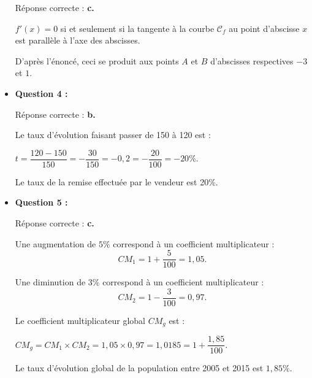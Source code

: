 \begin{corrige}
\begin{itemize}
          Réponse correcte :\quad\textbf{ c.}
          \par
          $f'(x)=0$ si et seulement si la tangente à la courbe $\mathscr{C}_f$ au point d'abscisse $x$ est parallèle à l'axe des abscisses.
          \par
          D'après l'énoncé, ceci se produit aux points $A$ et $B$ d'abscisses respectives $-3$ et $1$.
          \par
          \par
          \item \textbf{Question 4 :}
          \par
          Réponse correcte :\quad\textbf{ b.}
          \par
          Le taux d'évolution faisant passer de 150 à 120 est :
          \par
          $t=\dfrac{120-150}{150}=-\dfrac{30}{150}=-0,2=-\dfrac{20}{100}=-20\%$.
          \par
          Le taux de la remise effectuée par le vendeur est 20\%.
          \par
          \par
          \item \textbf{Question 5 :}
          \par
          Réponse correcte :\quad\textbf{ c.}
          \par
          Une augmentation de $5\%$ correspond à un coefficient multiplicateur :
          \[ CM_1=1+\dfrac{5}{100} = 1,05.\]
          \par
          Une diminution de $3\%$ correspond à un coefficient multiplicateur :
          \[ CM_2=1-\dfrac{3}{100} =0,97. \]
          \par
          Le coefficient multiplicateur global $CM_g$ est :
          \par
          $ CM_g=CM_1\times CM_2 = 1,05\times 0,97 = 1,0185 = 1+\dfrac{1,85}{100}. $
          \par
          Le taux d'évolution global de la population entre 2005 et 2015 est $1,85\%$.
          \par
          \par
     \end{itemize}
     \par
\end{corrige}
